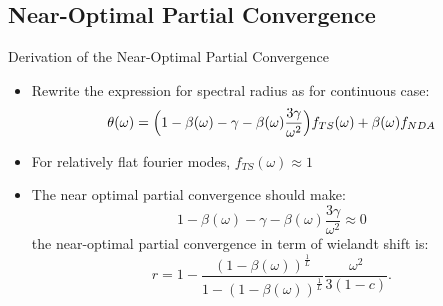 \subsection{Near-Optimal Partial Convergence}
\begin{frame}{Derivation of the Near-Optimal Partial Convergence}
\vspace{-1em}
 \begin{itemize}
    \item Rewrite the expression for spectral radius as for continuous case:
    \begin{equation}
       \theta(\omega)=\Big( 1-\beta(\omega)-\gamma-\beta(\omega)\frac{3\gamma}{\omega^2} \Big)f_{TS}(\omega)
        +\beta(\omega)f_{NDA} 
    \end{equation}
    \item For relatively flat fourier modes, $f_{TS}(\omega)\approx 1$
    \item The near optimal partial convergence should make:
    \vspace{-0.2cm}
    \begin{equation}
        1-\beta(\omega)-\gamma-\beta(\omega)\frac{3\gamma}{\omega^2}\approx0
    \end{equation}
    \vspace{-1em}
    the near-optimal partial convergence in term of wielandt shift is:
    \begin{equation}\label{eq:opr}
        r=1-\frac{\left(1-\beta(\omega)\right)^{\frac{1}{L}}}{1-\left(1-\beta(\omega)\right)^{\frac{1}{L}}}\frac{\omega^2}{3(1-c)}.
    \end{equation}   
     \vspace{-1em}
\end{itemize}  
\end{frame}
